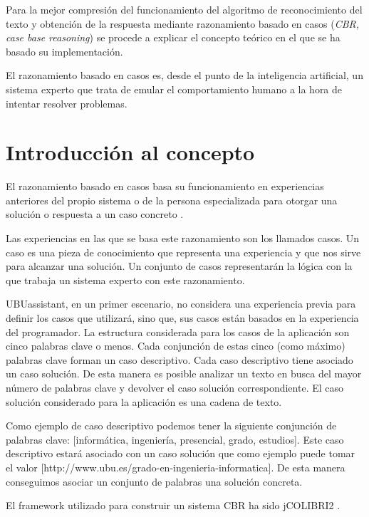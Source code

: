 
Para la mejor compresión del funcionamiento del algoritmo de reconocimiento del texto y obtención de la respuesta mediante razonamiento basado en casos (\emph{CBR, case base reasoning}) se procede a explicar el concepto teórico en el que se ha basado su implementación.

El razonamiento basado en casos es, desde el punto de la inteligencia artificial, un sistema experto que trata de emular el comportamiento humano a la hora de intentar resolver problemas.

\section{Introducción al concepto}\label{intro-concepto}

El razonamiento basado en casos basa su funcionamiento en experiencias anteriores del propio sistema o de la persona especializada para otorgar una solución o respuesta a un caso concreto \cite{wiki:cbr}.

Las experiencias en las que se basa este razonamiento son los llamados casos. Un caso es una pieza de conocimiento que representa una experiencia y que nos sirve para alcanzar una solución. Un conjunto de casos representarán la lógica con la que trabaja un sistema experto con este razonamiento.

UBUassistant, en un primer escenario, no considera una experiencia previa para definir los casos que utilizará, sino que, sus casos están basados en la experiencia del programador.
La estructura considerada para los casos de la aplicación son cinco palabras clave o menos. Cada conjunción de estas cinco (como máximo) palabras clave forman un caso descriptivo. Cada caso descriptivo tiene asociado un caso solución. De esta manera es posible analizar un texto en busca del mayor número de palabras clave y devolver el caso solución correspondiente. El caso solución considerado para la aplicación es una cadena de texto.

Como ejemplo de caso descriptivo podemos tener la siguiente conjunción de palabras clave: [informática, ingeniería, presencial, grado, estudios]. Este caso descriptivo estará asociado con un caso solución que como ejemplo puede tomar el valor [http://www.ubu.es/grado-en-ingenieria-informatica]. De esta manera conseguimos asociar un conjunto de palabras una solución concreta.

El framework utilizado para construir un sistema CBR ha sido jCOLIBRI2 \cite{colibri:gen}.

